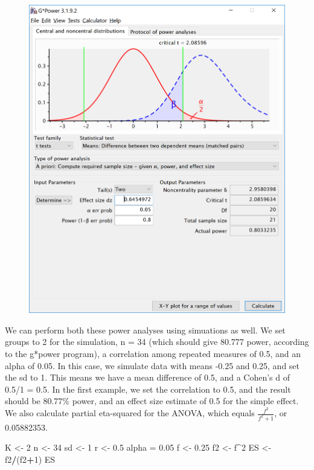 \documentclass[]{article}
\newenvironment{Shaded}{\begin{snugshade}}{\end{snugshade}}
\newcommand{\DecValTok}[1]{\textcolor[rgb]{0.00,0.00,0.81}{#1}}
\newcommand{\FloatTok}[1]{\textcolor[rgb]{0.00,0.00,0.81}{#1}}
\newcommand{\StringTok}[1]{\textcolor[rgb]{0.31,0.60,0.02}{#1}}
\newcommand{\OperatorTok}[1]{\textcolor[rgb]{0.81,0.36,0.00}{\textbf{#1}}}
\newcommand{\NormalTok}[1]{#1}
\begin{document}
\begin{figure}
\centering
\includegraphics{screenshots/gpower_10.png}
\caption{}
\end{figure}

We can perform both these power analyses using simuations as well. We
set groups to 2 for the simulation, n = 34 (which should give 80.777
power, according to the g*power program), a correlation among repeated
measures of 0.5, and an alpha of 0.05. In this case, we simulate data
with means -0.25 and 0.25, and set the sd to 1. This means we have a
mean difference of 0.5, and a Cohen's d of 0.5/1 = 0.5. In the first
example, we set the correlation to 0.5, and the result should be 80.77\%
power, and an effect size estimate of 0.5 for the simple effect. We also
calculate partial eta-squared for the ANOVA, which equals
\(\frac{f^2}{f^2+1}\), or 0.05882353.

\begin{Shaded}
\begin{Highlighting}[]
\NormalTok{K <-}\StringTok{ }\DecValTok{2}
\NormalTok{n <-}\StringTok{ }\DecValTok{34}
\NormalTok{sd <-}\StringTok{ }\DecValTok{1}
\NormalTok{r <-}\StringTok{ }\FloatTok{0.5}
\NormalTok{alpha =}\StringTok{ }\FloatTok{0.05}
\NormalTok{f <-}\StringTok{ }\FloatTok{0.25}
\NormalTok{f2 <-}\StringTok{ }\NormalTok{f}\OperatorTok{^}\DecValTok{2}
\NormalTok{ES <-}\StringTok{ }\NormalTok{f2}\OperatorTok{/}\NormalTok{(f2}\OperatorTok{+}\DecValTok{1}\NormalTok{)}
\NormalTok{ES}
\end{Highlighting}
\end{Shaded}
\end{document}

